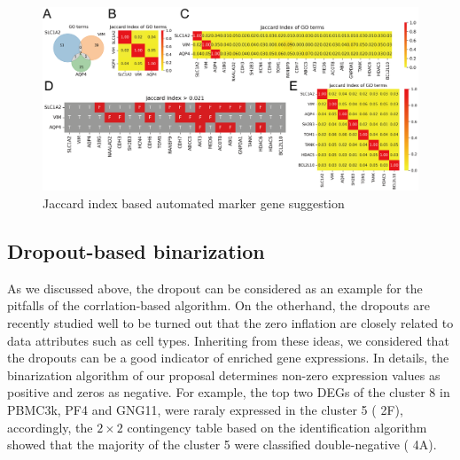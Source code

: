 \documentclass{article}
\begin{document}
\begin{figure}[htb]
  \centering
  \includegraphics[scale=0.7]{./figs/exported/figure_3.png}
  \caption{Jaccard index based automated marker gene suggestion}
  \label{jibased}
\end{figure}


\subsection*{Dropout-based binarization}
As we discussed above, the dropout can be considered as an example for the pitfalls of the corrlation-based algorithm.
On the otherhand, the dropouts are recently studied well to be turned out that the zero inflation are closely related 
to data attributes such as cell types\cite{qiu2020embracing, zappia2017splatter}. Inheriting from these ideas, we considered that the dropouts can be 
a good indicator of enriched gene expressions. In details, the binarization algorithm of our proposal determines 
non-zero expression values as positive and zeros as negative. For example, the top two DEGs of the cluster 8 in 
PBMC3k, PF4 and GNG11, were raraly expressed in the cluster 5 (\figurename{ 2F}), accordingly, the $2\times 2$ contingency 
table based on the identification algorithm showed that the majority of the cluster 5 were classified double-negative 
(\figurename{ 4A}).
\end{document}
